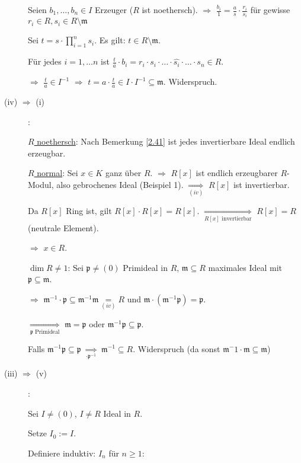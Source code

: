 \begin{Bew}
\begin{description}
Seien $b_1, \ldots, b_n \in I$ Erzeuger ($R$ ist noethersch). $\Rightarrow$ $\frac{b_i}{1} = \frac{a}{s} \cdot \frac{r_i}{s_i}$ f\"ur gewisse $r_i \in R, s_i \in R \setminus \mathfrak{m}$

Sei $t = s \cdot \prod_{i=1}^{n} s_i$. Es gilt: $t \in R \setminus \mathfrak{m}$.

F\"ur jedes $i = 1, \ldots n$ ist $\frac{t}{a} \cdot b_i = r_i \cdot s_i \cdot \ldots \cdot \widehat{s_i} \cdot \ldots \cdot s_n \in R$.

$\Rightarrow$ $\frac{t}{a} \in I^{-1}$ $\Rightarrow$ $t = a \cdot \frac{t}{a} \in I \cdot I^{-1} \subseteq \mathfrak{m}$. Widerspruch.

\item[(iv) $\Rightarrow$ (i)]:

\underline{$R$ noethersch}: Nach Bemerkung \ref{2.41} ist jedes invertierbare Ideal endlich erzeugbar.

\underline{$R$ normal}: Sei $x \in K$ ganz \"uber $R$. $\Rightarrow$ $R[x]$ ist endlich erzeugbarer $R$-Modul, also gebrochenes Ideal (Beispiel 1). $\underset{(iv)}{\Rightarrow}$ $R[x]$ ist invertierbar. 

Da $R[x]$ Ring ist, gilt $R[x] \cdot R[x] = R[x]$. $\underset{R[x]\text{ invertierbar}}{\Rightarrow}$ $R[x] = R$ (neutrale Element).

$\Rightarrow$ $x \in R$.

\underline{$\dim R \neq 1$}: Sei $\mathfrak{p} \neq (0)$ Primideal in $R$, $\mathfrak{m} \subseteq R$ maximales Ideal mit $\mathfrak{p} \subseteq \mathfrak{m}$.

$\Rightarrow$ $\mathfrak{m}^{-1} \cdot \mathfrak{p} \subseteq \mathfrak{m}^{-1} \mathfrak{m} \underset{(iv)}{=} R$ und $\mathfrak{m} \cdot (\mathfrak{m}^{-1} \mathfrak{p}) = \mathfrak{p}$.

$\underset{\mathfrak{p}\text{ Primideal}}{\Rightarrow}$ $\mathfrak{m} = \mathfrak{p}$ oder $\mathfrak{m}^{-1} \mathfrak{p} \subseteq \mathfrak{p}$.

Falls $\mathfrak{m}^{-1} \mathfrak{p} \subseteq \mathfrak{p}$ $\underset{\cdot \mathfrak{p}^{-1}}{\Rightarrow}$ $\mathfrak{m}^{-1} \subseteq R$. Widerspruch (da sonst $\mathfrak{m}^-1 \cdot \mathfrak{m} \subseteq \mathfrak{m}$)

\item[(iii) $\Rightarrow$ (v)]:

Sei $I \neq (0)$, $I \neq R$ Ideal in $R$.

Setze $I_0 := I$.

Definiere induktiv: $I_n$ f\"ur $n \geq 1$:


\end{description}
\end{Bew}
